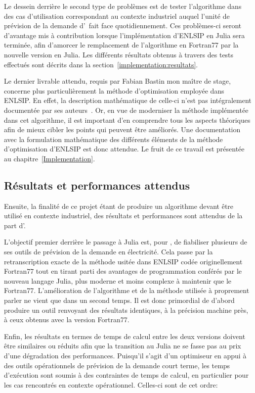 Le dessein derrière le second type de problèmes est de tester l'algorithme dans des cas d'utilisation
correspondant au contexte industriel auquel l'unité de prévision de la demande d'\HQ\ fait face quotidiennement. Ces problèmes-ci seront d'avantage mis à contribution
lorsque l'implémentation d'ENLSIP en Julia sera terminée, afin d'amorcer le remplacement de l'algorithme en Fortran77 par la nouvelle version en Julia. 
Les différents résultats obtenus à travers des tests effectués sont décrits dans la section~\ref{implementation:resultats}.

Le dernier livrable attendu, requis par Fabian Bastin mon maître de stage, concerne plus particulièrement la méthode d'optimisation 
employée dans ENLSIP. En effet, la description mathématique de celle-ci n'est pas intégralement documentée 
par ses auteurs~\citet{lindwedin88}. Or, en vue de moderniser la méthode implémentée dans cet algorithme, il est important
d'en comprendre tous les aspects théoriques afin de mieux cibler les points qui peuvent être améliorés. Une documentation avec la formulation mathématique des 
différents éléments de la méthode d'optimisation d'ENLSIP est donc attendue. Le fruit de ce travail est présentée au chapitre~\ref{Implementation}.

\subsection*{Résultats et performances attendus}\label{besoins:resultats}

Ensuite, la finalité de ce projet étant de produire un algorithme devant être utilisé en contexte industriel, des résultats et performances sont attendus de la part
d'\HQ. 

L'objectif premier derrière le passage à Julia est, pour \HQ, de fiabiliser plusieurs de ses outils de prévision de la demande en électricité. Cela passe par la retranscription
 exacte de la méthode usitée dans ENLSIP codée originellement Fortran77 tout en tirant parti des avantages de programmation conférés par le nouveau langage Julia, plus moderne et moins complexe à maintenir 
 que le Fortran77. L'amélioration de l'algorithme et de la méthode utilisée à proprement parler ne vient que dans un second temps. Il est donc primordial de d'abord 
 produire un outil renvoyant des résultats identiques, à la précision machine près, à ceux obtenus avec la version Fortran77. 

Enfin, les résultats en termes de temps de calcul entre les deux versions doivent être similaires ou réduits afin que la transition au Julia ne se fasse pas au prix d'une 
 dégradation des performances. Puisqu'il s'agit d'un optimiseur en appui à des outils opérationnels de prévision de la demande court terme, les temps d'exécution
 sont soumis à des contraintes de temps de calcul, en particulier pour les cas rencontrés en contexte opérationnel. Celles-ci sont de cet ordre:

